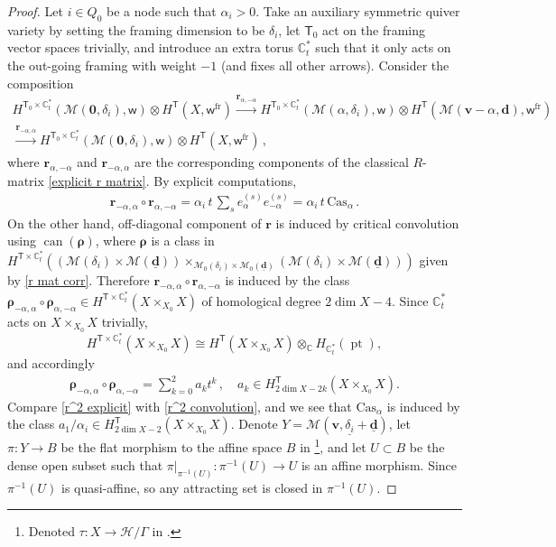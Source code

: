 \documentclass[10pt]{amsart}
\theoremstyle{definition}
\numberwithin{equation}{section}
\newcommand{\bC}{\mathbb{C}}
\newcommand{\bv}{\mathbf{v}}
\newcommand{\bd}{\mathbf{d}}
\newcommand{\cH}{\mathcal{H}}
\newcommand{\cM}{\mathcal{M}}
\newcommand{\sT}{\mathsf{T}}
\newcommand{\sw}{\mathsf{w}}
\newcommand{\can}{\operatorname{can}}
\newcommand{\pt}{\operatorname{pt}}
\begin{document}
\begin{proof}
Let $i\in Q_0$ be a node such that $\alpha_i>0$. Take an auxiliary symmetric quiver variety by setting the framing dimension to be $\delta_i$, let $\sT_0$ act on the framing vector spaces trivially, and introduce an extra torus $\bC^*_t$ such that it only acts on the out-going framing with weight $-1$ (and fixes all other arrows). Consider the composition 
\begin{multline*}
H^{\sT_0\times \bC^*_t}(\cM(\mathbf 0,\delta_i),\sw)\otimes H^{\sT}(X,\sw^{\mathrm{fr}})\xrightarrow{\pmb r_{\alpha,-\alpha}} H^{\sT_0\times \bC^*_t}(\cM(\alpha,\delta_i),\sw)\otimes H^{\sT}(\cM(\bv-\alpha,\bd),\sw^{\mathrm{fr}})\\
\xrightarrow{\pmb r_{-\alpha,\alpha}} H^{\sT_0\times \bC^*_t}(\cM(\mathbf 0,\delta_i),\sw)\otimes H^{\sT}(X,\sw^{\mathrm{fr}})\,,
\end{multline*}
where $\pmb r_{\alpha,-\alpha}$ and $\pmb r_{-\alpha,\alpha}$ are the corresponding components of the classical $R$-matrix \eqref{explicit r matrix}. By explicit computations,
\begin{align}\label{r^2 explicit}
    \pmb r_{-\alpha,\alpha}\circ \pmb r_{\alpha,-\alpha}=\alpha_i\,t\,\sum_{s}e^{(s)}_\alpha e^{(s)}_{-\alpha}=\alpha_i\,t\,\mathrm{Cas}_\alpha\,.
\end{align}
On the other hand, off-diagonal component of $\pmb r$ is induced by critical convolution using $\can(\pmb \rho)$, where $\pmb\rho$ is a class in $H^{\sT\times \bC^*_t}\left((\cM(\delta_i)\times \cM(\underline{\bd}))\times_{\cM_0(\delta_i)\times \cM_0(\underline{\bd})}(\cM(\delta_i)\times \cM(\underline{\bd}))\right)$ given by \eqref{r mat corr}. Therefore $\pmb r_{-\alpha,\alpha}\circ \pmb r_{\alpha,-\alpha}$ is induced by the class $\pmb \rho_{-\alpha,\alpha}\circ \pmb \rho_{\alpha,-\alpha}\in H^{\sT\times \bC^*_t}(X\times_{X_0} X)$ of homological degree $2\dim X-4$. Since $\bC^*_t$ acts on $X\times_{X_0} X$ trivially, 
$$H^{\sT\times \bC^*_t}(X\times_{X_0} X)\cong H^{\sT}(X\times_{X_0} X)\otimes_\bC H_{\bC^*_t}(\pt),$$ 
and accordingly
\begin{align}\label{r^2 convolution}
    \pmb \rho_{-\alpha,\alpha}\circ \pmb \rho_{\alpha,-\alpha}=\sum_{k=0}^2 a_k t^k\,,\quad a_k\in H^{\sT}_{2\dim X-2k}(X\times_{X_0} X).
\end{align}
Compare \eqref{r^2 explicit} with \eqref{r^2 convolution}, and we see that $\mathrm{Cas}_\alpha$ is induced by the class $a_1/\alpha_i\in H^{\sT}_{2\dim X-2}(X\times_{X_0} X)$. Denote $Y=\cM(\bv,\underline{\delta_i}+\underline{\bd})$, let $\pi\colon Y\to B$ be the flat morphism to the affine space $B$ in \cite{COZZ3}\footnote{Denoted $\tau\colon X\to \cH/\Gamma$ in \cite{COZZ3}.}, and let $U\subset B$ be the dense open subset such that $\pi|_{\pi^{-1}(U)}\colon \pi^{-1}(U)\to U$ is an affine morphism. Since $\pi^{-1}(U)$ is quasi-affine, so any attracting set is closed in $\pi^{-1}(U)$. 

\end{proof}
\end{document}
